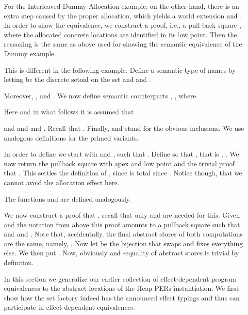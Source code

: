 \documentclass[orivec]{llncs}
\makeatletter
\newif\iffull\fullfalse
\renewcommand\subsection{\@startsection{subsection}{2}{\z@}{-2\p@ \@plus -4\p@ \@minus -4\p@}{-0.5em \@plus -0.22em \@minus -0.1em}{\normalfont\normalsize\bfseries}}
\makeatother
\begin{document}
For the Interleaved Dummy Allocation example, on the other hand, there is
an extra step caused by the proper allocation, which yields a world
extension  and . In order to show the equivalence, we construct a
proof, i.e., a pull-back square , where the
allocated concrete locations are identified in its low point. Then the
reasoning is the same as above used for showing the semantic equivalence
of the Dummy example.

This is different in the following example. Define a semantic type 
of names by letting  be the discrete setoid on the set  and
 and .
\iffull


\noindent
We now define semantic counterparts , 
. We omit the dummy
arguments of type .
\else
Moreover, 
, and .
We now define semantic counterparts , 
, where
\fi
\iffull

Here and in what follows it is assumed that
\else



\noindent
Here and in what follows it is assumed that
\fi
 and
 and
 and . Recall that
. Finally,  and
 stand for the obvious inclusions.  We use
analogous definitions for the primed variants.

In order to define  we start with
 and ,
 such that . Define
 so that , that is
, . We now return the
pullback square  with apex  and low
point  and the trivial proof that . This 
settles the definition of , since  is total since
. Notice though, that we cannot avoid the allocation
effect here.

The functions  and  are defined analogously.

We now construct a proof that , recall that only
 and
 are needed for this. Given  and the notation from
above this proof amounts to a pullback square
 such that  and
 and . Note that, accidentally, the final abstract stores of
both computations are the same, namely, . Now let  be the
bijection that swaps  and fixes everything else. We
then put .  Now, obviously
 and -equality of
abstract stores is trivial by definition.

\subsection{Heap PERs}
In this section we generalize our earlier collection of effect-dependent program
equivalences 
\cite{DBLP:conf/ppdp/BentonKBH07} to the abstract locations of the
Heap PERs instantiation. We first show how the
set factory indeed has the announced effect typings and thus can
participate in effect-dependent equivalences.
\end{document}
